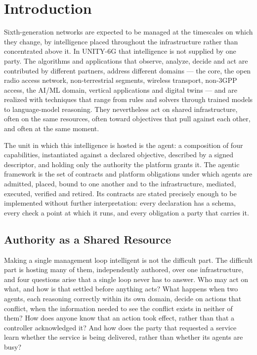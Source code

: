 
\hypertarget{introduction}{%
\section{Introduction}\label{introduction}}

Sixth-generation networks are expected to be managed at the timescales
on which they change, by intelligence placed throughout the
infrastructure rather than concentrated above it. In UNITY-6G that
intelligence is not supplied by one party. The algorithms and
applications that observe, analyze, decide and act are contributed by
different partners, address different domains --- the core, the open
radio access network, non-terrestrial segments, wireless transport,
non-3GPP access, the AI/ML domain, vertical applications and digital
twins --- and are realized with techniques that range from rules and
solvers through trained models to language-model reasoning. They
nevertheless act on shared infrastructure, often on the same resources,
often toward objectives that pull against each other, and often at the
same moment.

The unit in which this intelligence is hosted is the agent: a
composition of four capabilities, instantiated against a declared
objective, described by a signed descriptor, and holding only the
authority the platform grants it. The agentic framework is the set of
contracts and platform obligations under which agents are admitted,
placed, bound to one another and to the infrastructure, mediated,
executed, verified and retired. Its contracts are stated precisely
enough to be implemented without further interpretation: every
declaration has a schema, every check a point at which it runs, and
every obligation a party that carries it.

\hypertarget{authority-as-a-shared-resource}{%
\subsection{Authority as a Shared Resource}\label{authority-as-a-shared-resource}}

Making a single management loop intelligent is not the difficult part.
The difficult part is hosting many of them, independently authored, over
one infrastructure, and four questions arise that a single loop never
has to answer. Who may act on what, and how is that settled before
anything acts? What happens when two agents, each reasoning correctly
within its own domain, decide on actions that conflict, when the
information needed to see the conflict exists in neither of them? How
does anyone know that an action took effect, rather than that a
controller acknowledged it? And how does the party that requested a
service learn whether the service is being delivered, rather than
whether its agents are busy?

